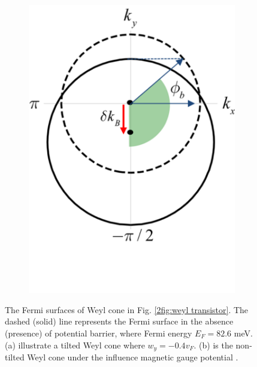 \begin{figure}[H]
\begin{subfigure}[b]{0.4\linewidth}
            \caption{}
            \label{2fig:anomalous fermi surface1}
        \end{subfigure}
        \begin{subfigure}[b]{0.4\linewidth}
            \includegraphics[width = \linewidth]{fig/Chap 2/anomalous fermi surface2.png}
            \caption{}
            \label{2fig:anomalous fermi surface2}
        \end{subfigure}
    \caption{The Fermi surfaces of Weyl cone in Fig. \ref{2fig:weyl transistor}. 
                The dashed (solid) line represents the Fermi surface in the absence (presence) of potential barrier, where Fermi energy $E_F = 82.6$ meV. 
                (a) illustrate a tilted Weyl cone where $w_y = -0.4 v_F$. 
                (b) is the non-tilted Weyl cone under the influence magnetic gauge potential \cite{Yesilyurt2017a}.}
    \label{2fig:anomalous fermi surface}
    \end{figure}

